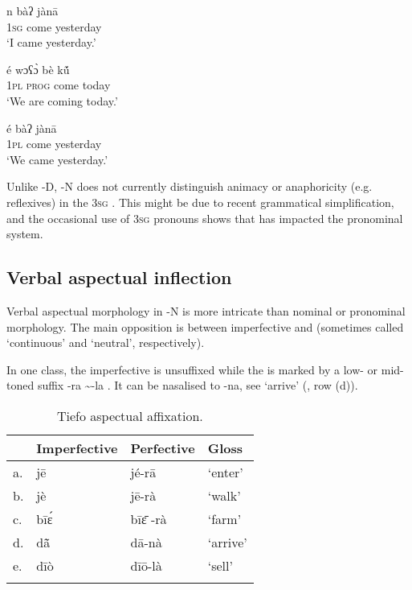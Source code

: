 \documentclass[output=paper,
modfonts
]{langscibook}
\begin{document}
\ea\label{ex:hangtan:6}
\gll n bàʔ jànā\\
     \textsc{1sg} come yesterday\\
\glt ‘I came yesterday.’
\z

\ea\label{ex:hangtan:7}
\gll é wɔʕ\`{ɔ} bè kṹ\\
     \textsc{1pl} \textsc{prog} come today\\
\glt ‘We are coming today.’
\z

\ea\label{ex:hangtan:8}
\gll é bàʔ jànā\\
     \textsc{1pl} come yesterday\\
\glt ‘We came yesterday.’
\z

Unlike -D, -N does not currently distinguish animacy or anaphoricity (e.g. reflexives) in the \textsc{3sg} . This might be due to recent grammatical simplification, and the occasional use of  \textsc{3sg} pronouns shows that  has impacted the pronominal system.

\subsection{Verbal aspectual inflection}\label{sec:hangtan:3.5}

Verbal aspectual morphology in -N is more intricate than nominal or pronominal morphology. The main opposition is between imperfective and  (sometimes called ‘continuous’ and ‘neutral’, respectively).

In one  class, the imperfective is unsuffixed while the  is marked by a low- or mid-toned suffix -ra {\textasciitilde}-la . It can be nasalised to -na, see ‘arrive’ (, row (d)).

\begin{table}
\caption{Tiefo aspectual affixation.}
\label{tab:hangtan:6}
\begin{tabularx}{\textwidth}{lXXX}
\lsptoprule
 & {\bfseries Imperfective} & {\bfseries Perfective} & {\bfseries Gloss}\\
\midrule
{a.} & { jē} & { jé-rā} & { ‘enter’}\\
{b.} & { jè} & { jē-rà} & { ‘walk’}\\
{c.} & { bī{\'{ɛ}}{ }} & { {bī}\={ɛ} {{}-rà} } & { ‘farm’ }\\
{d.} & { d{\={ã}}} & { dā-nà} & { ‘arrive’}\\
{e.} & { dīò} & { dī\=o-là} & { ‘sell’}\\
\lspbottomrule
\end{tabularx}


\end{table}
\end{document}
